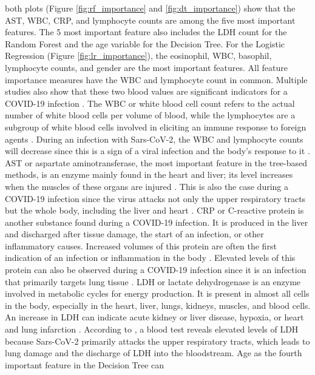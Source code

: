 both plots (Figure \ref{fig:rf_importance} and \ref{fig:dt_importance}) show 
that the AST, WBC, CRP, and lymphocyte counts are among the five most important 
features.
The 5 most important feature also includes the LDH count for the Random Forest 
and the age variable for the Decision Tree. For the Logistic Regression (Figure 
\ref{fig:lr_importance}), the eosinophil, WBC, basophil, lymphocyte counts, and 
gender are the most important features. All feature importance 
measures have the WBC and lymphocyte count in common. Multiple studies also show 
that these two blood values are significant indicators for a COVID-19 infection 
\cite{RN162, RN185, RN186}. 
The WBC or white blood cell count refers to the actual number of white blood 
cells per volume of blood, while the lymphocytes are a subgroup of white blood 
cells 
involved in eliciting an immune response to foreign agents \cite{RN137, RN188}. 
During an infection with Sars-CoV-2, the WBC and lymphocyte counts will 
decrease since this is a sign of a viral infection and the body's response to 
it \cite{RN162,RN186, RN185}.
AST or aspartate aminotransferase, the most important feature in the tree-based 
methods, is an enzyme mainly found in the heart and liver; its level increases 
when 
the muscles of these organs are injured \cite{RN189, RN188}. This is also the 
case during a COVID-19 infection since the virus attacks not only the upper 
respiratory tracts but the whole body, including the liver and 
heart \cite{RN182}. CRP or C-reactive protein is another substance found during 
a COVID-19 infection. It is produced in the liver and discharged after 
tissue damage, the start of an infection, or other inflammatory causes. 
Increased volumes of this protein are often the first indication of an 
infection or inflammation in the body \cite{RN138, RN188}. Elevated levels of 
this protein can also be observed during a COVID-19 infection since it is an 
infection that primarily targets lung tissue \cite{RN187, RN162}. LDH or 
lactate 
dehydrogenase is an enzyme involved in metabolic cycles for energy production. 
It is present in almost all cells in the body, especially in the heart, 
liver, lungs, kidneys, muscles, and blood cells. An increase in LDH can 
indicate acute kidney or liver disease, hypoxia, or heart and lung 
infarction \cite{RN190, RN188}. According to \cite{RN162, RN187}, a blood test 
reveals elevated levels of LDH because Sars-CoV-2 primarily attacks the upper 
respiratory tracts, which leads to lung damage and the discharge of LDH into 
the bloodstream. Age as the fourth important feature in the Decision Tree can 
